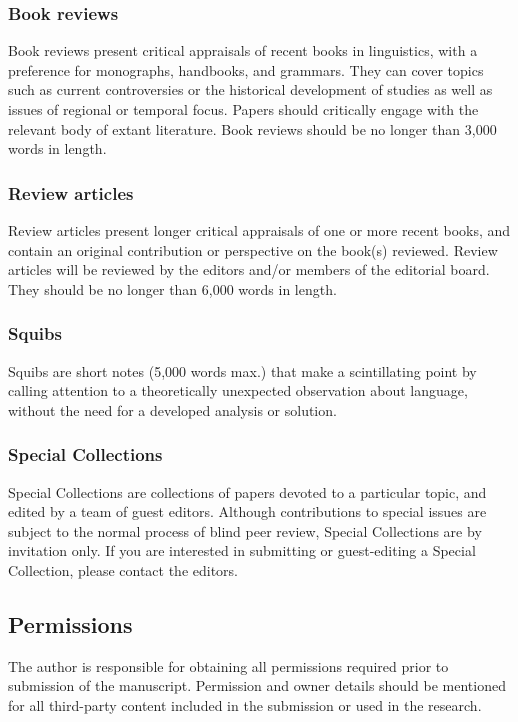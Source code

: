 \documentclass[charis,linguex]{glossa}
\begin{document}
\subsubsection{Book reviews}

Book reviews present critical appraisals of recent books in linguistics, with a preference for monographs, handbooks, and grammars. They can cover topics such as current controversies or the historical development of studies as well as issues of regional or temporal focus. Papers should critically engage with the relevant body of extant literature. Book reviews should be no longer than 3,000 words in length.

\subsubsection{Review articles}

Review articles present longer critical appraisals of one or more recent books, and contain an original contribution or perspective on the book(s) reviewed. Review articles will be reviewed by the editors and/or members of the editorial board. They should be no longer than 6,000 words in length.

\subsubsection{Squibs}

Squibs are short notes (5,000 words max.) that make a scintillating point by calling attention to a theoretically unexpected observation about language, without the need for a developed analysis or solution.

\subsubsection{Special Collections}

Special Collections are collections of papers devoted to a particular topic, and edited by a team of guest editors. Although contributions to special issues are subject to the normal process of blind peer review, Special Collections are by invitation only. If you are interested in submitting or guest-editing a Special Collection, please contact the editors.

\subsection{Permissions}
The author is responsible for obtaining all permissions required prior to submission of the manuscript. Permission and owner details should be mentioned for all third-party content included in the submission or used in the research.
\end{document}

